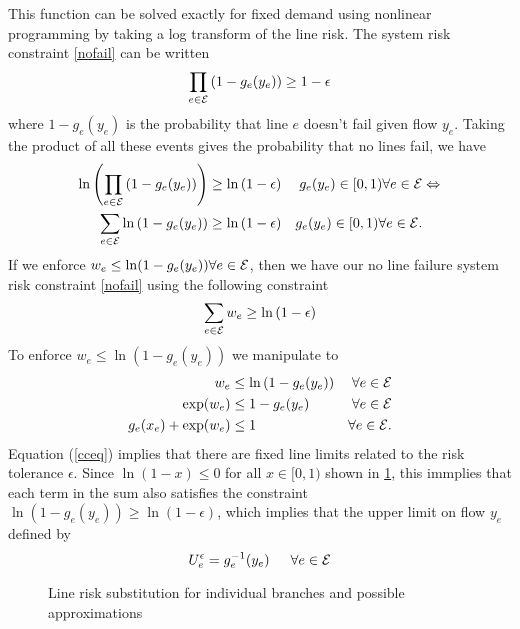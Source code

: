 This function can be solved exactly for fixed demand using nonlinear programming by taking a log transform of the line risk.  The system risk constraint \cref{nofail} can be written
\begin{equation*}  \prod_{e \in \mathcal{E}} \left( 1 - g_e(y_e) \right) \geq 1 - \epsilon
  \end{equation*}  
where $1 - g_e(y_e)$ is the probability that line $e$ doesn't fail given flow $y_e$.  Taking the product of all these events gives the probability that no lines fail, we have
\begin{align*}
  \ln \left( \prod_{e \in \mathcal{E}}\left( 1 - g_e(y_e)\right) \right) &\geq \ln \left(  1 - \epsilon \right)  & g_e(y_e) \in [0,1) \forall e  \in \mathcal{E} & \Leftrightarrow \\
  \sum_{e \in \mathcal{E}} \ln \left( 1-g_e(y_e) \right)  &\geq \ln \left( 1- \epsilon \right) & g_e(y_e) \in [0,1) \forall e  \in \mathcal{E}. &
\end{align*}
If we enforce $w_e \leq \ln (1-g_e(y_e)) \forall e \in \mathcal{E}$, then we have our no line failure system risk constraint \cref{nofail} using the following constraint
\begin{equation}\label{cceq}
\sum_{e \in \mathcal{E}} w_e  \geq \ln \left( 1-\epsilon \right)
\end{equation}
To enforce $w_e \leq \ln \left( 1 -g_e(y_e) \right)$ we manipulate to
\begin{align*}
w_e &\leq \ln \left( 1 - g_e(y_e)\right)  & \forall e \in \mathcal{E} \\
\exp(w_e) &\leq 1-g_e(y_e)  & \forall e \in \mathcal{E} \\
g_e(x_e) + \exp(w_e) &\leq 1  & \forall e \in \mathcal{E} .
\end{align*}
Equation (\ref{cceq}) implies that there are fixed line limits related to the risk tolerance $\epsilon$.  Since $\ln \left(1 - x \right) \leq 0 $  for all $x \in [0,1)$ shown in \cref{fig:linerisksub}, this immplies that each term in the sum also satisfies the constraint  $\ln \left(1-g_e(y_e)\right) \geq \ln \left( 1-\epsilon \right)$, which implies that the upper limit on flow $y_e$  defined by
\begin{equation}
U_e^\epsilon = g_e^{-1}(y_e) \hspace{15px} \forall e \in \cE
\end{equation}


\begin{figure}
\begin{center} 

\end{center}
\caption{Line risk substitution for individual branches and possible approximations}\label{fig:linerisksub}
\end{figure}




